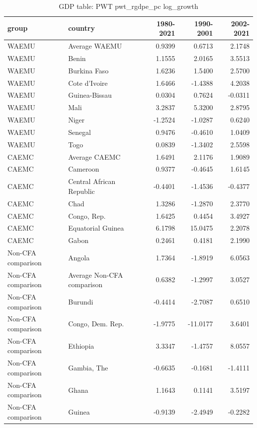 \begin{table}

\caption{GDP table: PWT pwt_rgdpe_pc log_growth}
\centering
\begin{tabular}[t]{llrrr}
\toprule
group & country & 1980-2021 & 1990-2001 & 2002-2021\\
\midrule
WAEMU & Average WAEMU & 0.9399 & 0.6713 & 2.1748\\
WAEMU & Benin & 1.1555 & 2.0165 & 3.5513\\
WAEMU & Burkina Faso & 1.6236 & 1.5400 & 2.5700\\
WAEMU & Cote d'Ivoire & 1.6466 & -1.4388 & 4.2038\\
WAEMU & Guinea-Bissau & 0.0304 & 0.7624 & -0.0311\\
\addlinespace
WAEMU & Mali & 3.2837 & 5.3200 & 2.8795\\
WAEMU & Niger & -1.2524 & -1.0287 & 0.6240\\
WAEMU & Senegal & 0.9476 & -0.4610 & 1.0409\\
WAEMU & Togo & 0.0839 & -1.3402 & 2.5598\\
CAEMC & Average CAEMC & 1.6491 & 2.1176 & 1.9089\\
\addlinespace
CAEMC & Cameroon & 0.9377 & -0.4645 & 1.6145\\
CAEMC & Central African Republic & -0.4401 & -1.4536 & -0.4377\\
CAEMC & Chad & 1.3286 & -1.2870 & 2.3770\\
CAEMC & Congo, Rep. & 1.6425 & 0.4454 & 3.4927\\
CAEMC & Equatorial Guinea & 6.1798 & 15.0475 & 2.2078\\
\addlinespace
CAEMC & Gabon & 0.2461 & 0.4181 & 2.1990\\
Non-CFA comparison & Angola & 1.7364 & -1.8919 & 6.0563\\
Non-CFA comparison & Average Non-CFA comparison & 0.6382 & -1.2997 & 3.0527\\
Non-CFA comparison & Burundi & -0.4414 & -2.7087 & 0.6510\\
Non-CFA comparison & Congo, Dem. Rep. & -1.9775 & -11.0177 & 3.6401\\
\addlinespace
Non-CFA comparison & Ethiopia & 3.3347 & -1.4757 & 8.0557\\
Non-CFA comparison & Gambia, The & -0.6635 & -0.1681 & -1.4111\\
Non-CFA comparison & Ghana & 1.1643 & 0.1141 & 3.5197\\
Non-CFA comparison & Guinea & -0.9139 & -2.4949 & -0.2282\\

\end{tabular}
\end{table}
